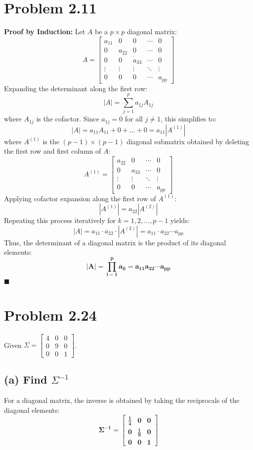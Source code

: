 \documentclass[11pt]{article}
\begin{document}
\section*{Problem 2.11}
\textbf{Proof by Induction:}
Let $A$ be a $p \times p$ diagonal matrix:
\[
A = \begin{bmatrix} 
a_{11} & 0 & 0 & \cdots & 0 \\
0 & a_{22} & 0 & \cdots & 0 \\
0 & 0 & a_{33} & \cdots & 0 \\
\vdots & \vdots & \vdots & \ddots & \vdots \\
0 & 0 & 0 & \cdots & a_{pp}
\end{bmatrix}
\]
Expanding the determinant along the first row:
\[
|A| = \sum_{j=1}^p a_{1j} A_{1j}
\]
where $A_{1j}$ is the cofactor. Since $a_{1j} = 0$ for all $j \neq 1$, this simplifies to:
\[
|A| = a_{11} A_{11} + 0 + \dots + 0 = a_{11} |A^{(1)}|
\]
where $A^{(1)}$ is the $(p-1) \times (p-1)$ diagonal submatrix obtained by deleting the first row and first column of $A$:
\[
A^{(1)} = \begin{bmatrix} 
a_{22} & 0 & \cdots & 0 \\
0 & a_{33} & \cdots & 0 \\
\vdots & \vdots & \ddots & \vdots \\
0 & 0 & \cdots & a_{pp}
\end{bmatrix}
\]
Applying cofactor expansion along the first row of $A^{(1)}$:
\[
|A^{(1)}| = a_{22} |A^{(2)}|
\]
Repeating this process iteratively for $k = 1, 2, \dots, p-1$ yields:
\[
|A| = a_{11} \cdot a_{22} \cdot |A^{(2)}| = a_{11} \cdot a_{22} \cdots a_{pp}
\]
Thus, the determinant of a diagonal matrix is the product of its diagonal elements:
\[
\mathbf{|A| = \prod_{i=1}^p a_{ii} = a_{11}a_{22}\cdots a_{pp}}
\]
\hfill $\blacksquare$

\section*{Problem 2.24}
Given $\Sigma = \begin{bmatrix} 4 & 0 & 0 \\ 0 & 9 & 0 \\ 0 & 0 & 1 \end{bmatrix}$.

\subsection*{(a) Find $\Sigma^{-1}$}
For a diagonal matrix, the inverse is obtained by taking the reciprocals of the diagonal elements:
\[
\mathbf{\Sigma^{-1} = \begin{bmatrix} \frac{1}{4} & 0 & 0 \\[4pt] 0 & \frac{1}{9} & 0 \\[4pt] 0 & 0 & 1 \end{bmatrix}}
\]
\end{document}
